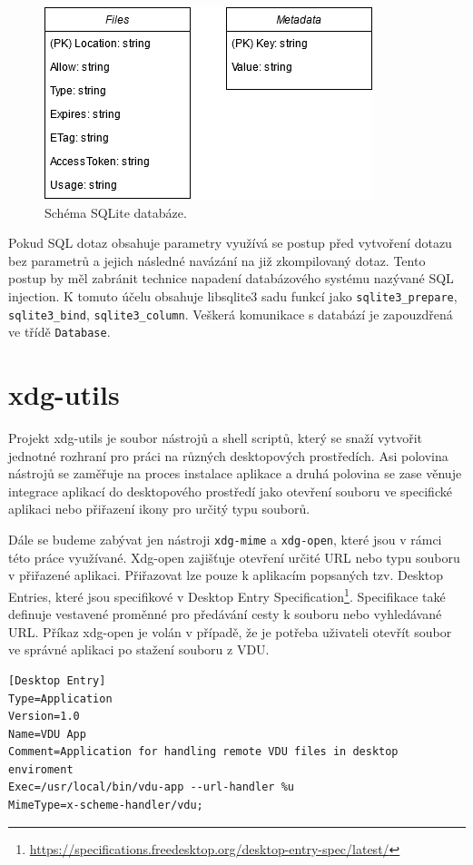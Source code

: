 \begin{figure}[h]
    \centering
    \includegraphics[width=0.6\linewidth]{other-fig/database.png}
    \caption{Schéma SQLite databáze.}
\end{figure}

Pokud SQL dotaz obsahuje parametry využívá se postup před vytvoření dotazu bez parametrů a jejich následné navázání na již zkompilovaný dotaz. Tento postup by měl zabránit
technice napadení databázového systému nazývané SQL injection. K tomuto účelu obsahuje libsqlite3 sadu funkcí jako \texttt{sqlite3\_prepare}, \texttt{sqlite3\_bind},
\texttt{sqlite3\_column}. Veškerá komunikace s databází je zapouzdřená ve třídě \texttt{Database}.

\section{xdg-utils}
Projekt xdg-utils je soubor nástrojů a shell scriptů, který se snaží vytvořit jednotné rozhraní pro práci na různých desktopových prostředích. Asi polovina nástrojů se 
zaměřuje na proces instalace aplikace a druhá polovina se zase věnuje integrace aplikací do desktopového prostředí jako otevření souboru ve specifické aplikaci nebo
přiřazení ikony pro určitý typu souborů.

Dále se budeme zabývat jen nástroji \texttt{xdg-mime} a \texttt{xdg-open}, které jsou v rámci této práce využívané. Xdg-open zajišťuje otevření určité URL nebo typu souboru
v přiřazené aplikaci. Přiřazovat lze pouze k aplikacím popsaných tzv. Desktop Entries, které jsou specifikové v Desktop Entry Specification\footnote{\url{https://specifications.freedesktop.org/desktop-entry-spec/latest/}}.
Specifikace také definuje vestavené proměnné pro předávání cesty k souboru nebo vyhledávané URL. Příkaz xdg-open je volán v případě, že je potřeba uživateli otevřít soubor ve
správné aplikaci po stažení souboru z VDU.

\newpage

\begin{lstlisting}[caption={Příklad struktury Desktop Entry souboru}]
[Desktop Entry]
Type=Application
Version=1.0
Name=VDU App
Comment=Application for handling remote VDU files in desktop enviroment
Exec=/usr/local/bin/vdu-app --url-handler %u
MimeType=x-scheme-handler/vdu;    
\end{lstlisting}

